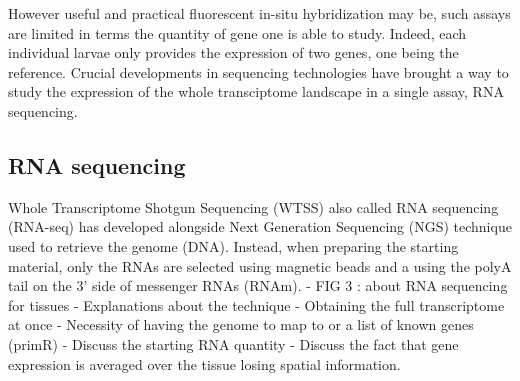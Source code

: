 	However useful and practical fluorescent in-situ hybridization may be, such assays are limited in terms the quantity of gene one is able to study. Indeed, each individual larvae only provides the expression of two genes, one being the reference. Crucial developments in sequencing technologies have brought a way to study the expression of the whole transciptome landscape in a single assay, RNA sequencing.

     \subsection{RNA sequencing}
     Whole Transcriptome Shotgun Sequencing (WTSS) also called RNA sequencing (RNA-seq) \cite{morin08,wang09} has developed alongside Next Generation Sequencing (NGS) technique used to retrieve the genome (DNA). Instead, when preparing the starting material, only the RNAs are selected using magnetic beads and a using the polyA tail on the 3' side of messenger RNAs (RNAm).
    - FIG 3 : about RNA sequencing for tissues
    - Explanations about the technique
    - Obtaining the full transcriptome at once
    - Necessity of having the genome to map to or a list of known genes (primR) 
    - Discuss the starting RNA quantity 
    - Discuss the fact that gene expression is averaged over the tissue losing spatial information.

%
%
%
%
%




